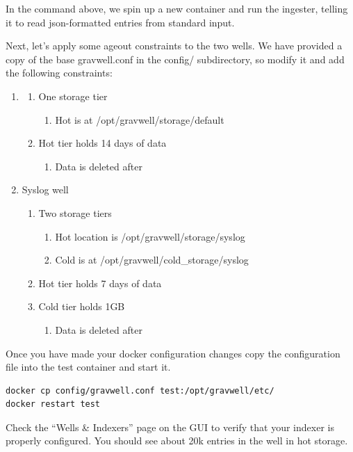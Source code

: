 {{In the command above, we spin up a new container and run the  ingester, telling it to read json-formatted entries from standard input.

Next, let's apply some ageout constraints to the two wells. We have provided a copy of the
base gravwell.conf in the config/ subdirectory, so modify it and add the following constraints:

\begin{enumerate}
	\item {}
	\begin{enumerate}
		\item{One storage tier}
		\begin{enumerate}
			\item Hot is at /opt/gravwell/storage/default
		\end{enumerate}
		\item Hot tier holds 14 days of data
		\begin{enumerate}
			\item Data is deleted after
		\end{enumerate}
	\end{enumerate}
	\item Syslog well
	\begin{enumerate}
		\item Two storage tiers
		\begin{enumerate}
			\item Hot location is /opt/gravwell/storage/syslog
			\item Cold is at /opt/gravwell/cold\_storage/syslog
		\end{enumerate}
		\item Hot tier holds 7 days of data
		\item Cold tier holds 1GB
		\begin{enumerate}
			\item Data is deleted after
		\end{enumerate}
	\end{enumerate}
\end{enumerate}

Once you have made your docker configuration changes copy the
configuration file into the test container and start it.

\begin{Verbatim}[breaklines=true]
docker cp config/gravwell.conf test:/opt/gravwell/etc/
docker restart test
\end{Verbatim}

Check the ``Wells \& Indexers'' page on the GUI to verify that your
indexer is properly configured. You should see about 20k entries in the
 well in hot storage.

}}
